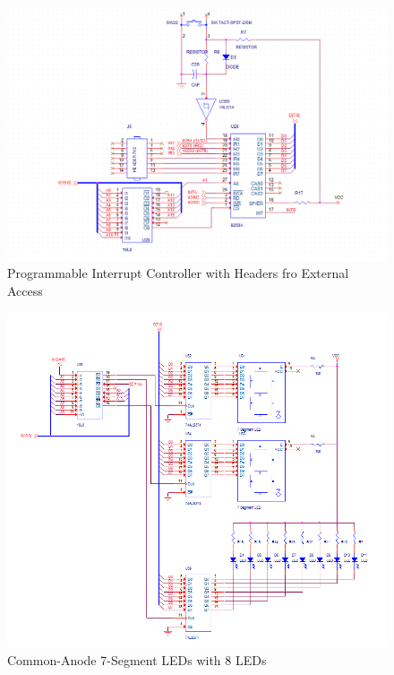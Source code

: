         \begin{figure}[ht]
            \begin{center}
                \includegraphics[width=1\textwidth]{figures/schematics/page9.png}
                \caption{Programmable Interrupt Controller with Headers fro External Access} \label{fig:page9}
            \end{center}
        \end{figure}

        \begin{figure}[ht]
            \begin{center}
                \includegraphics[width=1\textwidth]{figures/schematics/page10.png}
                \caption{Common-Anode 7-Segment LEDs with 8 LEDs} \label{fig:page10}
            \end{center}
        \end{figure}

